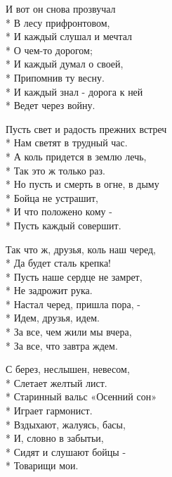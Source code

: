 \medskip

\begin{minipage}{\linewidth}
И вот он снова прозвучал\\*
В лесу прифронтовом,\\*
И каждый слушал и мечтал\\*
О чем-то дорогом;\\*
И каждый думал о своей,\\*
Припомнив ту весну.\\*
И каждый знал - дорога к ней\\*
Ведет через войну.\\
\end{minipage}\par\medskip\nobreak

\medskip

\begin{minipage}{\linewidth}
Пусть свет и радость прежних встреч\\*
Нам светят в трудный час.\\*
А коль придется в землю лечь,\\*
Так это ж только раз.\\*
Но пусть и смерть в огне, в дыму\\*
Бойца не устрашит,\\*
И что положено кому -\\*
Пусть каждый совершит.\\
\end{minipage}\par\medskip\nobreak

\medskip

\begin{minipage}{\linewidth}
Так что ж, друзья, коль наш черед,\\*
Да будет сталь крепка!\\*
Пусть наше сердце не замрет,\\*
Не задрожит рука.\\*
Настал черед, пришла пора, -\\*
Идем, друзья, идем.\\*
За все, чем жили мы вчера,\\*
За все, что завтра ждем.\\
\end{minipage}\par\medskip\nobreak

\medskip

\begin{minipage}{\linewidth}
С берез, неслышен, невесом,\\*
Слетает желтый лист.\\*
Старинный вальс «Осенний сон»\\*
Играет гармонист.\\*
Вздыхают, жалуясь, басы,\\*
И, словно в забытьи,\\*
Сидят и слушают бойцы -\\*
Товарищи мои.\\
\end{minipage}

